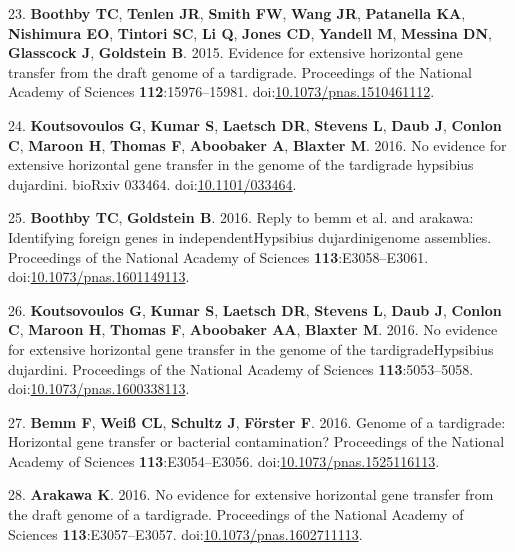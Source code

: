 \documentclass[11pt,]{article}
\begin{document}
\hypertarget{ref-Boothby2015}{}
23. \textbf{Boothby TC}, \textbf{Tenlen JR}, \textbf{Smith FW},
\textbf{Wang JR}, \textbf{Patanella KA}, \textbf{Nishimura EO},
\textbf{Tintori SC}, \textbf{Li Q}, \textbf{Jones CD}, \textbf{Yandell
M}, \textbf{Messina DN}, \textbf{Glasscock J}, \textbf{Goldstein B}.
2015. Evidence for extensive horizontal gene transfer from the draft
genome of a tardigrade. Proceedings of the National Academy of Sciences
\textbf{112}:15976--15981.
doi:\href{https://doi.org/10.1073/pnas.1510461112}{10.1073/pnas.1510461112}.

\hypertarget{ref-Koutsovoulos2016a}{}
24. \textbf{Koutsovoulos G}, \textbf{Kumar S}, \textbf{Laetsch DR},
\textbf{Stevens L}, \textbf{Daub J}, \textbf{Conlon C}, \textbf{Maroon
H}, \textbf{Thomas F}, \textbf{Aboobaker A}, \textbf{Blaxter M}. 2016.
No evidence for extensive horizontal gene transfer in the genome of the
tardigrade hypsibius dujardini. bioRxiv 033464.
doi:\href{https://doi.org/10.1101/033464}{10.1101/033464}.

\hypertarget{ref-Boothby2016}{}
25. \textbf{Boothby TC}, \textbf{Goldstein B}. 2016. Reply to bemm et
al. and arakawa: Identifying foreign genes in independentHypsibius
dujardinigenome assemblies. Proceedings of the National Academy of
Sciences \textbf{113}:E3058--E3061.
doi:\href{https://doi.org/10.1073/pnas.1601149113}{10.1073/pnas.1601149113}.

\hypertarget{ref-Koutsovoulos2016b}{}
26. \textbf{Koutsovoulos G}, \textbf{Kumar S}, \textbf{Laetsch DR},
\textbf{Stevens L}, \textbf{Daub J}, \textbf{Conlon C}, \textbf{Maroon
H}, \textbf{Thomas F}, \textbf{Aboobaker AA}, \textbf{Blaxter M}. 2016.
No evidence for extensive horizontal gene transfer in the genome of the
tardigradeHypsibius dujardini. Proceedings of the National Academy of
Sciences \textbf{113}:5053--5058.
doi:\href{https://doi.org/10.1073/pnas.1600338113}{10.1073/pnas.1600338113}.

\hypertarget{ref-Bemm2016}{}
27. \textbf{Bemm F}, \textbf{Weiß CL}, \textbf{Schultz J},
\textbf{Förster F}. 2016. Genome of a tardigrade: Horizontal gene
transfer or bacterial contamination? Proceedings of the National Academy
of Sciences \textbf{113}:E3054--E3056.
doi:\href{https://doi.org/10.1073/pnas.1525116113}{10.1073/pnas.1525116113}.

\hypertarget{ref-Arakawa2016}{}
28. \textbf{Arakawa K}. 2016. No evidence for extensive horizontal gene
transfer from the draft genome of a tardigrade. Proceedings of the
National Academy of Sciences \textbf{113}:E3057--E3057.
doi:\href{https://doi.org/10.1073/pnas.1602711113}{10.1073/pnas.1602711113}.
\end{document}
